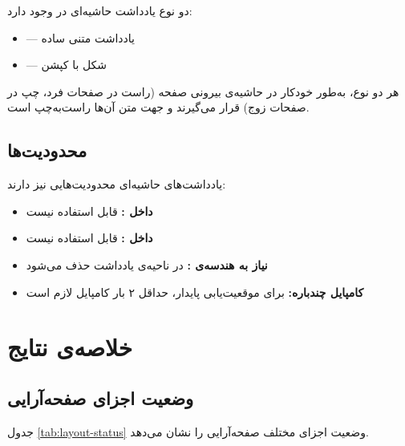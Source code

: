 \documentclass{matinbook}
\begin{document}
دو نوع یادداشت حاشیه‌ای در  وجود دارد:

\begin{itemize}
    \item {} — یادداشت متنی ساده
    \item {} — شکل با کپشن
\end{itemize}

هر دو نوع، به‌طور خودکار در حاشیه‌ی بیرونی صفحه (راست
در صفحات فرد، چپ در صفحات زوج) قرار می‌گیرند و جهت
متن آن‌ها راست‌به‌چپ است.

\section{محدودیت‌ها}
\label{sec:marginnote-limits}

یادداشت‌های حاشیه‌ای محدودیت‌هایی نیز دارند:

\begin{itemize}
    \item \textbf{داخل :} قابل استفاده نیست
    \item \textbf{داخل :} قابل استفاده نیست
    \item \textbf{نیاز به هندسه‌ی :} در  ناحیه‌ی یادداشت حذف می‌شود
    \item \textbf{کامپایل چندباره:} برای موقعیت‌یابی پایدار، حداقل ۲ بار کامپایل لازم است
\end{itemize}

\chapter{خلاصه‌ی نتایج}
\label{chap:summary}

\section{وضعیت اجزای صفحه‌آرایی}
\label{sec:summary-layout}

جدول \cref{tab:layout-status} وضعیت اجزای مختلف
صفحه‌آرایی  را نشان می‌دهد.
\end{document}
